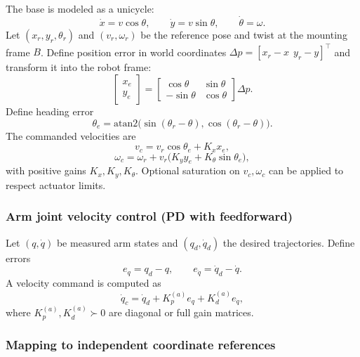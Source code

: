 \documentclass[conference]{IEEEtran}
\begin{document}
The base is modeled as a unicycle:
\begin{equation}
\dot x = v\cos\theta,\qquad
\dot y = v\sin\theta,\qquad
\dot\theta = \omega.
\end{equation}
Let $(x_r,y_r,\theta_r)$ and $(v_r,\omega_r)$ be the reference pose and twist at
the mounting frame $B$. Define position error in world coordinates
$\Delta p=[x_r-x~~y_r-y]^\top$ and transform it into the robot frame:
\begin{equation}
\begin{bmatrix}x_e\\y_e\end{bmatrix}
=
\begin{bmatrix}
\cos\theta & \sin\theta\\
-\sin\theta & \cos\theta
\end{bmatrix}
\Delta p.
\end{equation}
Define heading error
\begin{equation}
\theta_e=\mathrm{atan2}\!\big(\sin(\theta_r-\theta),\cos(\theta_r-\theta)\big).
\end{equation}
The commanded velocities are
\begin{equation}
v_c = v_r\cos\theta_e + K_x x_e,
\label{eq:kanayama_v}
\end{equation}
\begin{equation}
\omega_c = \omega_r + v_r\big(K_y y_e + K_\theta \sin\theta_e\big),
\label{eq:kanayama_omega}
\end{equation}
with positive gains $K_x,K_y,K_\theta$. Optional saturation on $v_c,\omega_c$
can be applied to respect actuator limits.

\subsubsection{Arm joint velocity control (PD with feedforward)}

Let $(q,\dot q)$ be measured arm states and $(q_d,\dot q_d)$ the desired
trajectories. Define errors
\begin{equation}
e_q=q_d-q,\qquad e_{\dot q}=\dot q_d-\dot q.
\end{equation}
A velocity command is computed as
\begin{equation}
\dot q_c=\dot q_d + K_p^{(a)} e_q + K_d^{(a)} e_{\dot q},
\label{eq:arm_pd}
\end{equation}
where $K_p^{(a)},K_d^{(a)}\succ0$ are diagonal or full gain matrices.

\subsubsection{Mapping to independent coordinate references}
\end{document}

